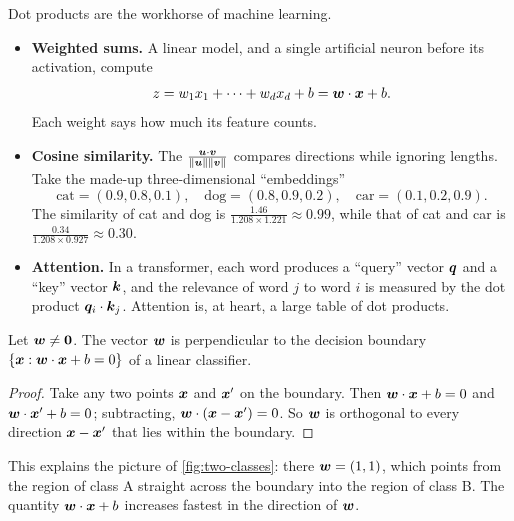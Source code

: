 \begin{mlnote}
Dot products are the workhorse of machine learning.
\begin{itemize}
  \item \textbf{Weighted sums.} A linear model, and a single artificial
    neuron before its activation, compute
    \[
      z = w_1x_1 + \dots + w_dx_d + b = \bm{w}\cdot\bm{x} + b .
    \]
    Each weight says how much its feature counts.
  \item \textbf{Cosine similarity.} The 
    $\frac{\bm{u}\cdot\bm{v}}{\lVert\bm{u}\rVert\lVert\bm{v}\rVert}$ compares directions while
    ignoring lengths. Take the made-up three-dimensional ``embeddings''
    \[
      \text{cat} = (0.9, 0.8, 0.1), \quad \text{dog} = (0.8, 0.9, 0.2),
      \quad \text{car} = (0.1, 0.2, 0.9).
    \]
    The similarity of cat and dog is
    $\frac{1.46}{1.208 \times 1.221} \approx 0.99$, while that of cat and car
    is $\frac{0.34}{1.208 \times 0.927} \approx 0.30$.
  \item \textbf{Attention.} In a transformer, each word produces a ``query''
    vector $\bm{q}$ and a ``key'' vector $\bm{k}$, and the relevance of word $j$ to
    word $i$ is measured by the dot product $\bm{q}_i \cdot \bm{k}_j$. Attention is,
    at heart, a large table of dot products.
\end{itemize}
\end{mlnote}

\begin{proposition}
\label{prop:normal-vector}
Let $\bm{w} \neq \bm{0}$. The vector $\bm{w}$ is perpendicular to the decision
boundary $\{\bm{x} : \bm{w}\cdot\bm{x} + b = 0\}$ of a linear classifier.
\end{proposition}

\begin{proof}
Take any two points $\bm{x}$ and $\bm{x}'$ on the boundary. Then
$\bm{w}\cdot\bm{x} + b = 0$ and $\bm{w}\cdot\bm{x}' + b = 0$; subtracting,
$\bm{w}\cdot(\bm{x} - \bm{x}') = 0$. So $\bm{w}$ is orthogonal to every direction
$\bm{x} - \bm{x}'$ that lies within the boundary.
\end{proof}

This explains the picture of \cref{fig:two-classes}: there
$\bm{w} = (1, 1)$, which points from the region of class A straight across the
boundary into the region of class B. The quantity $\bm{w}\cdot\bm{x} + b$ increases
fastest in the direction of $\bm{w}$.

\sectionexercises

